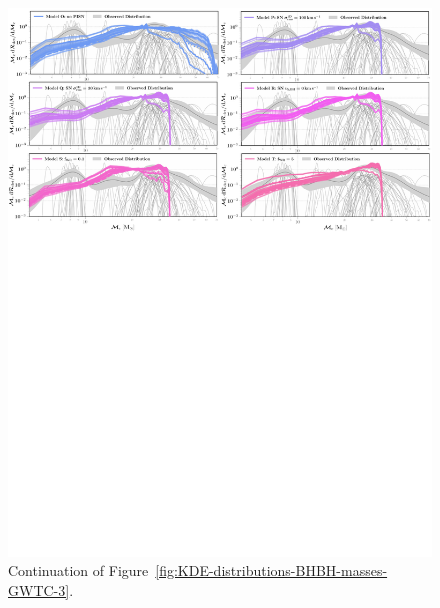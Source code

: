 \documentclass[fleqn,usenatbib]{mnras}
\begin{document}
\begin{figure}
    \centering
\includegraphics[width=1\textwidth,trim={0cm 0cm 0 0},clip]{figures/COMBINED_part2_loglog.pdf} %
\caption*{Continuation of Figure~\ref{fig:KDE-distributions-BHBH-masses-GWTC-3}.  \href{https://github.com/FloorBroekgaarden/Double-Compact-Object-Mergers/blob/main/plottingCode/Detectable_Distributions_GWTC-3/COMBINED_part2_loglog.pdf}{\faFileImage} 
}
    \label{fig:KDE-distributions-BHBH-masses-GWTC-3-part-2}
\end{figure}
%
\end{document}
